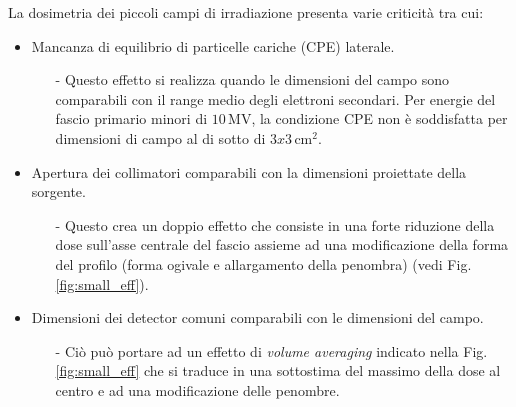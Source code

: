 La dosimetria dei piccoli campi di irradiazione presenta varie criticità \cite{Das2008} tra cui:
\begin{itemize}
\item Mancanza di equilibrio di particelle cariche (CPE) laterale.
\begin{itemize}
\item[-] Questo effetto si realizza quando le dimensioni del campo sono comparabili con il range medio degli elettroni secondari. Per energie del fascio primario minori di $10\,$MV, la condizione CPE non è soddisfatta per dimensioni di campo al di sotto di $3x3\,$cm$^2$.
\end{itemize}
\item Apertura dei collimatori comparabili con la dimensioni proiettate della sorgente.
\begin{itemize}
\item[-] Questo crea un doppio effetto che consiste in una forte riduzione della dose sull'asse centrale del fascio assieme ad una modificazione della forma del profilo (forma ogivale e allargamento della penombra) (vedi Fig.\ref{fig:small_eff}).
\end{itemize}
\item Dimensioni dei detector comuni comparabili con le dimensioni del campo.
\begin{itemize}
\item[-] Ciò può portare ad un effetto di \textit{volume averaging} indicato nella Fig.\ref{fig:small_eff} che si traduce in una sottostima del massimo della dose al centro e ad una modificazione delle penombre.
\end{itemize}
\end{itemize}
